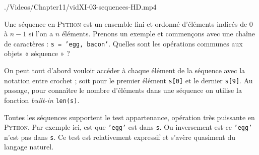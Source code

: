 \begin{marginvideo}
		{./Videos/Chapter11/vidXI-03-sequences-HD.mp4}%
\end{marginvideo}

Une séquence en \textsc{Python} est un ensemble fini et ordonné d'éléments indicés de $0$ à $n-1$ si l'on a $n$ éléments. Prenons un exemple et commençons avec une chaîne de caractères : \texttt{s = 'egg, bacon'}. Quel\-les sont les opérations communes aux objets « séquence » ?

On peut tout d'abord vouloir accéder à chaque élément de la séquence avec la notation entre crochet ; soit pour le premier élément \texttt{s[0]} et le dernier \texttt{s[9]}. Au passage, pour connaître le nombre d'éléments dans une séquence on utilise la fonction \textit{built-in} \texttt{len(s)}.




Toutes les séquences supportent le test appartenance, opération très puissante en \textsc{Python}. Par exemple ici, est-que \texttt{'egg'} est dans \texttt{s}. Ou inversement est-ce \texttt{'egg'} n'est pas dans \texttt{s}. Ce test est relativement expressif et s'avère quasiment du langage naturel.

